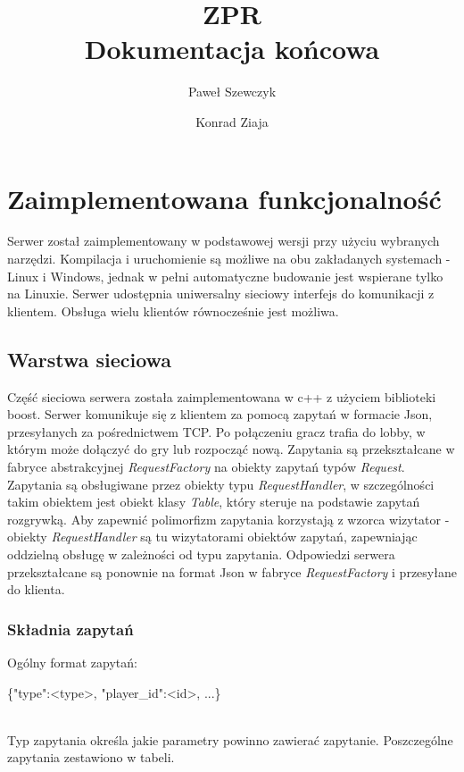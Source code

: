 \documentclass[12pt,a4paper]{article}
\title{ZPR\\
Dokumentacja końcowa }
\author{
Paweł Szewczyk
\and
Konrad Ziaja
}
\begin{document}
\maketitle

\section{Zaimplementowana funkcjonalność}
Serwer został zaimplementowany w podstawowej wersji przy użyciu wybranych narzędzi.
Kompilacja i uruchomienie są możliwe na obu zakładanych systemach - Linux i Windows,
jednak w pełni automatyczne budowanie jest wspierane tylko na Linuxie.
Serwer udostępnia uniwersalny sieciowy interfejs do komunikacji z klientem.
Obsługa wielu klientów równocześnie jest możliwa.

\subsection{Warstwa sieciowa}
Część sieciowa serwera została zaimplementowana w c++ z użyciem biblioteki boost.
Serwer komunikuje się z klientem za pomocą zapytań w formacie Json, przesyłanych za pośrednictwem TCP.
Po połączeniu gracz trafia do lobby, w którym może dołączyć do gry
lub rozpocząć nową.
Zapytania są przekształcane w fabryce abstrakcyjnej \textit{RequestFactory}
na obiekty zapytań typów \textit{Request}. Zapytania są obsługiwane przez
obiekty typu \textit{RequestHandler}, w szczególności takim obiektem jest
obiekt klasy \textit{Table}, który steruje na podstawie zapytań rozgrywką.
Aby zapewnić polimorfizm zapytania korzystają z wzorca wizytator - 
obiekty \textit{RequestHandler} są tu wizytatorami obiektów zapytań,
zapewniając oddzielną obsługę w zależności od typu zapytania.
Odpowiedzi serwera przekształcane są ponownie na format Json w fabryce
\textit{RequestFactory} i przesyłane do klienta.

\subsubsection{Składnia zapytań}
Ogólny format zapytań:\\
\begin{code}
\{"type":<type>, "player\_id":<id>, ...\}
\end{code}\\
Typ zapytania określa jakie parametry powinno zawierać zapytanie. Poszczególne zapytania zestawiono w tabeli.
\end{document}

